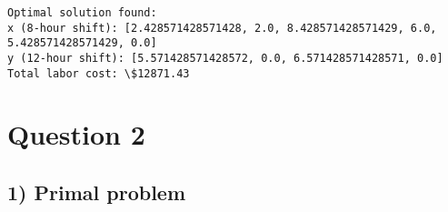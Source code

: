 \documentclass[11pt]{article}
\begin{document}
    \begin{Verbatim}[commandchars=\\\{\}]
Optimal solution found:
x (8-hour shift): [2.428571428571428, 2.0, 8.428571428571429, 6.0,
5.428571428571429, 0.0]
y (12-hour shift): [5.571428571428572, 0.0, 6.571428571428571, 0.0]
Total labor cost: \$12871.43
    \end{Verbatim}

    \hypertarget{question-2}{%
\section{Question 2}\label{question-2}}

    \hypertarget{primal-problem}{%
\subsection{1) Primal problem}\label{primal-problem}}
\end{document}
